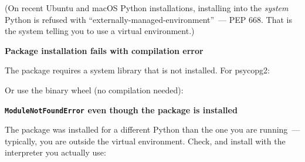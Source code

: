 \noindent{}(On recent Ubuntu and macOS Python installations, installing into the \emph{system} Python is refused with ``externally-managed-environment''~--- PEP 668. That is the system telling you to use a virtual environment.)

\textbf{Package installation fails with compilation error}

The package requires a system library that is not installed. For psycopg2:

\begin{codebox}[short]

\begin{Shaded}
\begin{Highlighting}[]

\end{Highlighting}
\end{Shaded}

\end{codebox}

\noindent{}Or use the binary wheel (no compilation needed):

\begin{codebox}[short]

\begin{Shaded}
\begin{Highlighting}[]
\end{Highlighting}
\end{Shaded}

\end{codebox}

\noindent{}\textbf{\texttt{ModuleNotFoundError} even though the package is installed}

The package was installed for a different Python than the one you are running~--- typically, you are outside the virtual environment. Check, and install with the interpreter you actually use:

\begin{codebox}[short]

\begin{Shaded}
\begin{Highlighting}[]
 
\end{Highlighting}
\end{Shaded}

\end{codebox}

